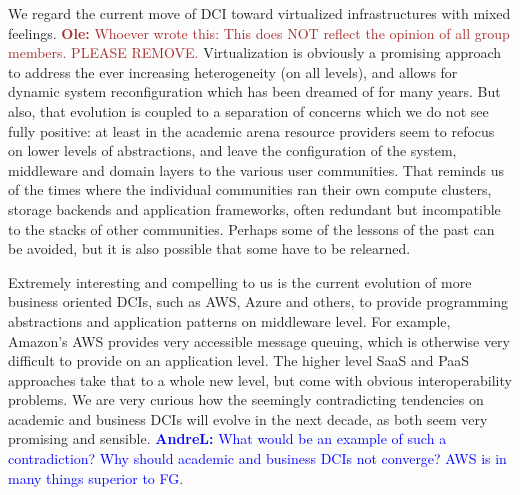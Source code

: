 \documentclass[]{article}
\newcommand{\B}[1]{\textbf{#1}}
\newcommand{\todo}[1]{{\textcolor{red}{\B{TODO:} #1 }}}
\newcommand{\alnote}[1]{{\textcolor{blue}{    \B{AndreL:  } #1 }}}
\newcommand{\ownote}[1]{{\textcolor{Brown}{   \B{Ole:     } #1 }}}
\newcommand{\alnote}[1]{}
\newcommand{\ownote}[1]{}
\begin{document}
We regard the current move of DCI toward virtualized infrastructures
with mixed feelings. \ownote{Whoever wrote this: This does NOT reflect
  the opinion of all group members. PLEASE REMOVE.} Virtualization is
obviously a promising approach to address the ever increasing
heterogeneity (on all levels), and allows for dynamic system
reconfiguration which has been dreamed of for many years.  But also,
that evolution is coupled to a separation of concerns which we do not
see fully positive: at least in the academic arena resource providers
seem to refocus on lower levels of abstractions, and leave the
configuration of the system, middleware and domain layers to the
various user communities.  That reminds us of the times where the
individual communities ran their own compute clusters, storage
backends and application frameworks, often redundant but incompatible
to the stacks of other communities.  Perhaps some of the lessons of
the past can be avoided, but it is also possible that some have to be
relearned.

Extremely interesting and compelling to us is the current evolution of
more business oriented DCIs, such as AWS, Azure and others, to provide
programming abstractions and application patterns on middleware level.
For example, Amazon's AWS provides very accessible message queuing,
which is otherwise very difficult to provide on an application level.
The higher level SaaS and PaaS approaches take that to a whole new
level, but come with obvious interoperability problems.  We are very
curious how the seemingly contradicting tendencies on academic and
business DCIs will evolve in the next decade, as both seem very
promising and sensible. \alnote{What would be an example of such a
  contradiction? Why should academic and business DCIs not converge?
  AWS is in many things superior to FG.}


\end{document}
